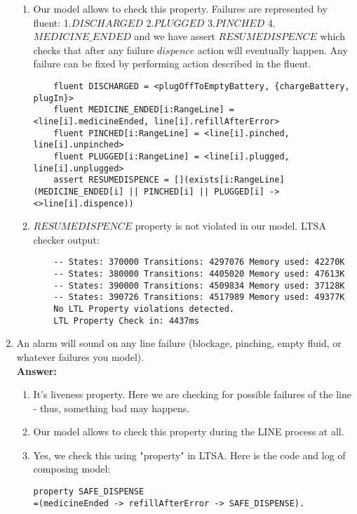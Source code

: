 \documentclass{article}
\begin{document}
\begin{enumerate}
\begin{enumerate}
    \item Our model allows to check this property. Failures are represented by fluent: 1.$DISCHARGED$ 2.$PLUGGED$ 
    3.$PINCHED$ 4.$MEDICINE\_ENDED$ and we have assert $RESUMEDISPENCE$ which checks that after any failure $dispence$ action
    will eventually happen. Any failure can be fixed by performing action described in the fluent.\\
    \begin{verbatim}
    fluent DISCHARGED = <plugOffToEmptyBattery, {chargeBattery, plugIn}>
    fluent MEDICINE_ENDED[i:RangeLine] = <line[i].medicineEnded, line[i].refillAfterError>
    fluent PINCHED[i:RangeLine] = <line[i].pinched, line[i].unpinched>
    fluent PLUGGED[i:RangeLine] = <line[i].plugged, line[i].unplugged>
    assert RESUMEDISPENCE = [](exists[i:RangeLine](MEDICINE_ENDED[i] || PINCHED[i] || PLUGGED[i] -> <>line[i].dispence))
    \end{verbatim}
    
    \item $RESUMEDISPENCE$ property is not violated in our model. LTSA checker output:
    \begin{verbatim}
    -- States: 370000 Transitions: 4297076 Memory used: 42270K
    -- States: 380000 Transitions: 4405020 Memory used: 47613K
    -- States: 390000 Transitions: 4509834 Memory used: 37128K
    -- States: 390726 Transitions: 4517989 Memory used: 49377K
    No LTL Property violations detected.
    LTL Property Check in: 4437ms
    \end{verbatim} 
    \end{enumerate}
    
    \item An alarm will sound on any line failure (blockage, pinching, empty fluid, or
whatever failures you model).\\
    \textbf{Answer:}
    \begin{enumerate}
    	\item It's liveness property. Here we are checking for possible failures of the line - thus, something bad may happens.
		\item Our model allows to check this property during the LINE process at all.
		\item Yes, we check this using "property" in LTSA. Here is the code and log of composing model:
\begin{verbatim}
property SAFE_DISPENSE
=(medicineEnded -> refillAfterError -> SAFE_DISPENSE).


\end{verbatim}
\end{enumerate}
\end{enumerate}
\end{document}
